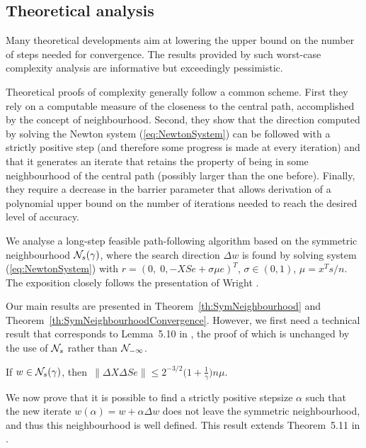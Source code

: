 %
%
\subsection{Theoretical analysis}

Many theoretical developments aim at lowering the upper bound on the number 
of steps needed for convergence. The results provided by such worst-case 
complexity analysis are informative but exceedingly pessimistic. 

Theoretical proofs of complexity generally follow a common scheme.
First they rely on a computable measure of the closeness to the central
path, accomplished by the concept of neighbourhood. Second,
they show that the direction computed by solving the Newton system
(\ref{eq:NewtonSystem}) can be followed with a strictly positive step
(and therefore some progress is made at every iteration) 
and that it generates an iterate 
that retains the property of being in some neighbourhood of the central 
path (possibly larger than the one before). Finally, they require
a decrease in the barrier parameter that allows derivation 
of a polynomial upper
bound on the number of iterations needed to reach the desired
level of accuracy.

We analyse a long-step feasible path-following 
algorithm based on the symmetric neighbourhood $\mathcal{N}_s(\gamma)$, 
where the search direction $\Delta w$ 
is found by solving system (\ref{eq:NewtonSystem}) with 
$r=(0,\; 0,-XSe+\sigma\mu e)^T$, $\sigma\in(0,1)$, $\mu=x^Ts/n$.
The exposition closely follows the presentation of Wright
\cite[Chapter~5]{ipm:Wright97}. 

Our main results are presented in Theorem~\ref{th:SymNeighbourhood}
and Theorem~\ref{th:SymNeighbourhoodConvergence}.
However, we first need a technical result that corresponds to
Lemma~5.10 in \cite{ipm:Wright97}, the proof of which is unchanged by the use 
of $\mathcal{N}_s$ rather than $\mathcal{N}_{-\infty}$.
%
\begin{lemma} \label{Wright:5.10}
If $w \in \mathcal{N}_s(\gamma)$, then\,
\(
  \|\Delta X\Delta Se\| \le 2^{-3/2}
                        \Big( 1+ \displaystyle{\frac{1}{\gamma}} \Big)n\mu.
\)
\end{lemma}

We now prove that it is possible to find a strictly positive stepsize 
$\alpha$ such that the new iterate 
$w(\alpha) = w + \alpha\Delta w$
does not leave the symmetric neighbourhood, and thus this 
neighbourhood is well defined. This result extends 
Theorem~5.11 in \cite{ipm:Wright97}.

